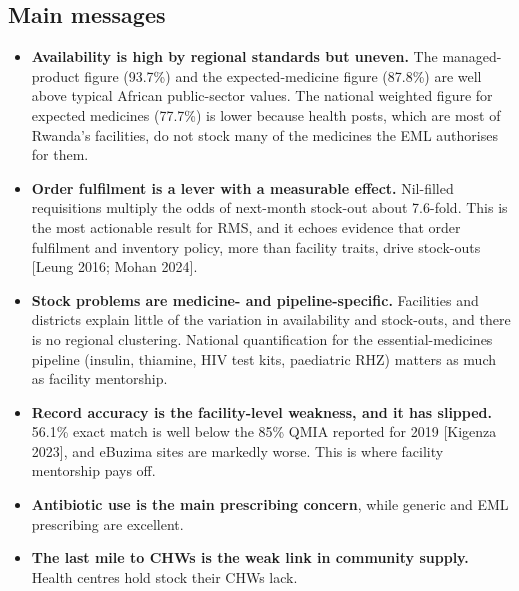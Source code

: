 \documentclass[10pt,a4paper]{article}
\begin{document}
\subsection{Main messages}
\begin{itemize}\item \textbf{Availability is high by regional standards but uneven.} The managed-product figure (93.7\%) and the expected-medicine figure (87.8\%) are well above typical African public-sector values. The national weighted figure for expected medicines (77.7\%) is lower because health posts, which are most of Rwanda's facilities, do not stock many of the medicines the EML authorises for them.
\item \textbf{Order fulfilment is a lever with a measurable effect.} Nil-filled requisitions multiply the odds of next-month stock-out about 7.6-fold. This is the most actionable result for RMS, and it echoes evidence that order fulfilment and inventory policy, more than facility traits, drive stock-outs [Leung 2016; Mohan 2024].
\item \textbf{Stock problems are medicine- and pipeline-specific.} Facilities and districts explain little of the variation in availability and stock-outs, and there is no regional clustering. National quantification for the essential-medicines pipeline (insulin, thiamine, HIV test kits, paediatric RHZ) matters as much as facility mentorship.
\item \textbf{Record accuracy is the facility-level weakness, and it has slipped.} 56.1\% exact match is well below the 85\% QMIA reported for 2019 [Kigenza 2023], and eBuzima sites are markedly worse. This is where facility mentorship pays off.
\item \textbf{Antibiotic use is the main prescribing concern}, while generic and EML prescribing are excellent.
\item \textbf{The last mile to CHWs is the weak link in community supply.} Health centres hold stock their CHWs lack.
\end{itemize}
\end{document}
